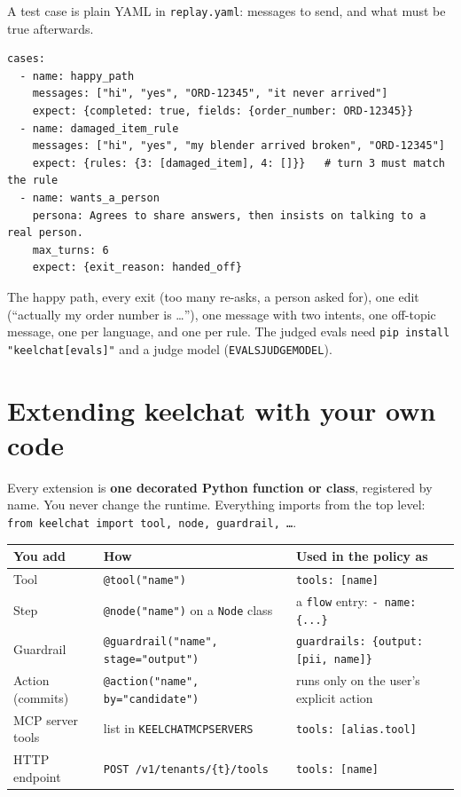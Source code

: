 \documentclass[11pt,a4paper]{article}
\newcommand{\codeus}{\textunderscore\allowbreak}
\newcommand{\code}[1]{{\renewcommand{\_}{\codeus}\texttt{\upshape #1}}}
\newcommand{\key}[1]{{\renewcommand{\_}{\codeus}\texttt{\color{ckey}#1}}}
\begin{document}
A test case is plain YAML in \code{replay.yaml}: messages to send, and what must be true afterwards.

\begin{lstlisting}[style=yamlstyle]
cases:
  - name: happy_path
    messages: ["hi", "yes", "ORD-12345", "it never arrived"]
    expect: {completed: true, fields: {order_number: ORD-12345}}
  - name: damaged_item_rule
    messages: ["hi", "yes", "my blender arrived broken", "ORD-12345"]
    expect: {rules: {3: [damaged_item], 4: []}}   # turn 3 must match the rule
  - name: wants_a_person
    persona: Agrees to share answers, then insists on talking to a real person.
    max_turns: 6
    expect: {exit_reason: handed_off}
\end{lstlisting}

\begin{tip}
The happy path, every exit (too many re-asks, a person asked for), one edit (``actually my order number is
\ldots''), one message with two intents, one off-topic message, one per language, and one per rule. The judged
evals need \code{pip install "keelchat[evals]"} and a judge model (\code{EVALS\_JUDGE\_MODEL}).
\end{tip}

\section{Extending keelchat with your own code}

Every extension is \textbf{one decorated Python function or class}, registered by name. You never change the
runtime. Everything imports from the top level: \code{from keelchat import tool, node, guardrail, \ldots}.

\begin{center}
\small
\begin{tabularx}{\textwidth}{@{}L{2.7cm}L{5.0cm}Y@{}}
\toprule
\textbf{You add} & \textbf{How} & \textbf{Used in the policy as} \\
\midrule
Tool & \code{@tool("name")} & \code{tools: [name]} \\
Step & \code{@node("name")} on a \code{Node} class & a \key{flow} entry: \code{- name: \{...\}} \\
Guardrail & \code{@guardrail("name", stage="output")} & \code{guardrails: \{output: [pii, name]\}} \\
Action (commits) & \code{@action("name", by="candidate")} & runs only on the user's explicit action \\
MCP server tools & list in \code{KEELCHAT\_MCP\_SERVERS} & \code{tools: [alias.tool]} \\
HTTP endpoint & \code{POST /v1/tenants/\{t\}/tools} & \code{tools: [name]} \\
\bottomrule
\end{tabularx}
\end{center}
\end{document}
